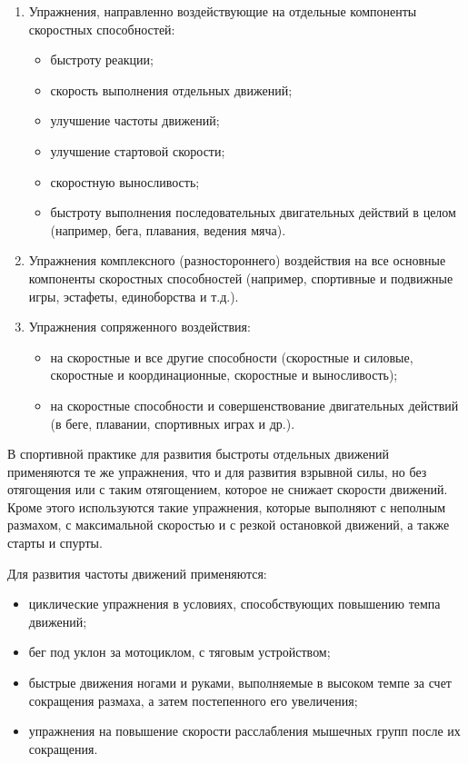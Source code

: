 \begin{enumerate}
    \item Упражнения, направленно воздействующие на отдельные компоненты скоростных способностей:
          \begin{itemize}
              \item быстроту реакции;
              \item скорость выполнения отдельных движений;
              \item улучшение частоты движений;
              \item улучшение стартовой скорости;
              \item скоростную выносливость;
              \item быстроту выполнения последовательных двигательных действий в целом (например, бега, плавания, ведения мяча).
          \end{itemize}

    \item Упражнения комплексного (разностороннего) воздействия на все основные компоненты скоростных способностей (например, спортивные и подвижные игры, эстафеты, единоборства и т.д.).

    \item Упражнения сопряженного воздействия:
          \begin{itemize}
              \item на скоростные и все другие способности (скоростные и силовые, скоростные и координационные, скоростные и выносливость);
              \item на скоростные способности и совершенствование двигательных действий (в беге, плавании, спортивных играх и др.).
          \end{itemize}
\end{enumerate}

В спортивной практике для развития быстроты отдельных движений применяются те же упражнения, что и для развития взрывной силы, но без отягощения или с таким отягощением, которое не снижает скорости движений. Кроме этого используются такие упражнения, которые выполняют с неполным размахом, с максимальной скоростью и с резкой остановкой движений, а также старты и спурты.

Для развития частоты движений применяются:
\begin{itemize}
    \item циклические упражнения в условиях, способствующих повышению темпа движений;
    \item бег под уклон за мотоциклом, с тяговым устройством;
    \item быстрые движения ногами и руками, выполняемые в высоком темпе за счет сокращения размаха, а затем постепенного его увеличения;
    \item упражнения на повышение скорости расслабления мышечных групп после их сокращения.
\end{itemize}

